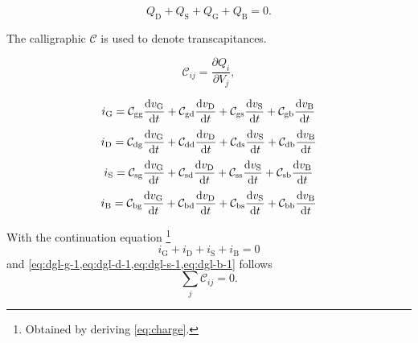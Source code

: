 \documentclass{article}[11pt]
\begin{document}
\cite{yang-chargeconvmos-83}


\cite{circit-revisitmeyer-89}


\cite{najm-csim-10}


\cite{chen-bsim3-02}


\cite{liu-mosfetmodel-01}
\cite{tsividis-mosfetmodel-11}
\cite{snider-transcapitance-95}
\cite{fox-transcap-90}


\begin{equation}\label{eq:charge}
Q_{\mathrm{D}}+Q_{\mathrm{S}}+Q_{\mathrm{G}}+Q_{\mathrm{B}}=0.
\end{equation}

The calligraphic $\mathcal{C}$ is used to denote transcapitances.

\begin{equation}\label{eq:capacitance}
\mathcal{C}_{ij}=\frac{\partial Q_{i}}{\partial V_{j}},
\end{equation}


\begin{equation}\label{eq:dgl-g-1}
i_{\mathrm{G}} = 
  \mathcal{C}_{\mathrm{gg}} \dv{v_{\mathrm{G}}}{t} 
+ \mathcal{C}_{\mathrm{gd}} \dv{v_{\mathrm{D}}}{t} 
+ \mathcal{C}_{\mathrm{gs}} \dv{v_{\mathrm{S}}}{t} 
+ \mathcal{C}_{\mathrm{gb}} \dv{v_{\mathrm{B}}}{t}
\end{equation}
\begin{equation}\label{eq:dgl-d-1}
i_{\mathrm{D}} = 
  \mathcal{C}_{\mathrm{dg}} \dv{v_{\mathrm{G}}}{t} 
+ \mathcal{C}_{\mathrm{dd}} \dv{v_{\mathrm{D}}}{t} 
+ \mathcal{C}_{\mathrm{ds}} \dv{v_{\mathrm{S}}}{t} 
+ \mathcal{C}_{\mathrm{db}} \dv{v_{\mathrm{B}}}{t}
\end{equation}
\begin{equation}\label{eq:dgl-s-1}
i_{\mathrm{S}} = 
  \mathcal{C}_{\mathrm{sg}} \dv{v_{\mathrm{G}}}{t} 
+ \mathcal{C}_{\mathrm{sd}} \dv{v_{\mathrm{D}}}{t} 
+ \mathcal{C}_{\mathrm{ss}} \dv{v_{\mathrm{S}}}{t} 
+ \mathcal{C}_{\mathrm{sb}} \dv{v_{\mathrm{B}}}{t}
\end{equation}
\begin{equation}\label{eq:dgl-b-1}
i_{\mathrm{B}} = 
  \mathcal{C}_{\mathrm{bg}} \dv{v_{\mathrm{G}}}{t} 
+ \mathcal{C}_{\mathrm{bd}} \dv{v_{\mathrm{D}}}{t} 
+ \mathcal{C}_{\mathrm{bs}} \dv{v_{\mathrm{S}}}{t} 
+ \mathcal{C}_{\mathrm{bb}} \dv{v_{\mathrm{B}}}{t}
\end{equation}

With the continuation equation%
\footnote{Obtained by deriving \eqref{eq:charge}.} 
\begin{equation}\label{eq:cont-eq}
i_{\mathrm{G}}+i_{\mathrm{D}}+i_{\mathrm{S}}+i_{\mathrm{B}}=0
\end{equation}
and \cref{eq:dgl-g-1,eq:dgl-d-1,eq:dgl-s-1,eq:dgl-b-1} follows
\begin{equation}\label{eq:cap-sum-1}
\sum_{j} \mathcal{C}_{ij} = 0. 
\end{equation}
\end{document}
